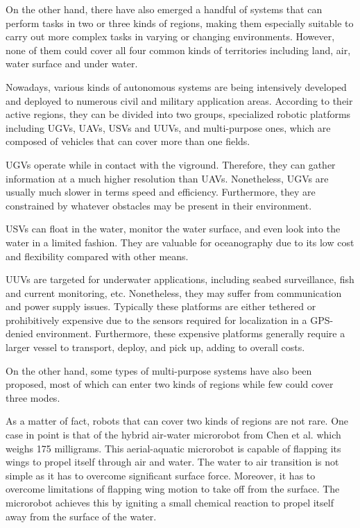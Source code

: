 
On the other hand, there have also emerged a handful of systems that can perform tasks in two or three kinds of regions, making them especially suitable to carry out more complex tasks in varying or changing environments. However, none of them could cover all four common kinds of territories including land, air, water surface and under water.

Nowadays, various kinds of autonomous systems are being intensively developed and deployed to numerous civil and military application areas. According to their active regions, they can be divided into two groups, specialized robotic platforms including UGVs, UAVs, USVs and UUVs, and multi-purpose ones, which are composed of vehicles that can cover more than one fields. 

UGVs operate while in contact with the viground. Therefore, they can gather information at a much higher resolution than UAVs. Nonetheless, UGVs are usually much slower in terms speed and efficiency. Furthermore, they are constrained by whatever obstacles may be present in their environment. 

USVs can float in the water, monitor the water surface, and even look into the water in a limited fashion. They are valuable for oceanography due to its low cost and flexibility compared with other means.

UUVs are targeted for underwater applications, including seabed surveillance, fish and current monitoring, etc. Nonetheless, they may suffer from communication and power supply issues. Typically these platforms are either tethered or prohibitively expensive due to the sensors required for localization in a GPS-denied environment. Furthermore, these expensive platforms generally require a larger vessel to transport, deploy, and pick up, adding to overall costs. 

On the other hand, some types of multi-purpose systems have also been proposed, most of which can enter two kinds of regions while few could cover three modes.

As a matter of fact, robots that can cover two kinds of regions are not rare. One case in point is that of the hybrid air-water microrobot from Chen et al. \cite{Chen2017} which weighs 175 milligrams. This aerial-aquatic microrobot is capable of flapping its wings to propel itself through air and water. The water to air transition is not simple as it has to overcome significant surface force. Moreover, it has to overcome limitations of flapping wing motion to take off from the surface. The microrobot achieves this by igniting a small chemical reaction to propel itself away from the surface of the water.

